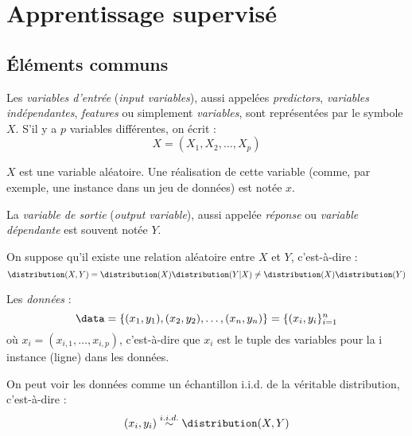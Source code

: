 \section{Apprentissage supervisé}
    \subsection{Éléments communs}
        \begin{definition}
            Les \textit{variables d'entrée} (\textit{input variables}), aussi appelées \textit{predictors}, \textit{variables indépendantes}, \textit{features} ou simplement \textit{variables}, sont représentées par le symbole \(X\). S'il y a \(p\) variables différentes, on écrit :
            \[X = (X_1, X_2, \dots, X_p)\]
        \end{definition}

        \begin{remarque}
            \(X\) est une variable aléatoire. Une réalisation de cette variable (comme, par exemple, une instance dans un jeu de données) est notée \(x\).
        \end{remarque}

        \begin{definition}
            La \textit{variable de sortie} (\textit{output variable}), aussi appelée \textit{réponse} ou \textit{variable dépendante} est souvent notée \(Y\).
        \end{definition}

        On suppose qu'il existe une relation aléatoire entre \(X\) et \(Y\), c'est-à-dire :
        \[\distribution(X, Y) = \distribution(X)\distribution(Y|X) \not= \distribution(X)\distribution(Y)\]

        \begin{definition}
            Les \textit{données} :
            \[
                \data = \{(x_1, y_1), (x_2, y_2), \dots, (x_n, y_n)\} = \{(x_i, y_i\}^n_{i=1}
            \]
            où \(x_i = (x_{i,1}, \dots, x_{i,p})\), c'est-à-dire que \(x_i\) est le tuple des variables pour la i\ieme{} instance (ligne) dans les données.

            On peut voir les données comme un échantillon i.i.d. de la véritable distribution, c'est-à-dire :
            \[(x_i, y_i) \stackrel{i.i.d.}{\sim} \distribution(X, Y)\]
        \end{definition}

